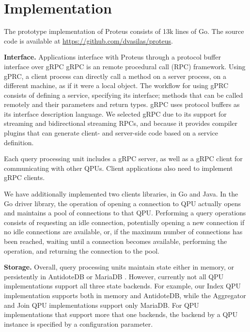\section{Implementation}
\label{sec:implementation}

The prototype implementation of Proteus consists of 13k lines of Go.
The source code is available at \url{https://github.com/dvasilas/proteus}.


\bigskip
\noindent
\textbf{Interface.}
Applications interface with Proteus through a protocol buffer \cite{protobuf:docs} interface over gRPC \cite{grpc:docs}
gRPC is an remote procedural call (RPC) framework.
Using gPRC, a client process can directly call a method on a server process, on a different machine, as if it were a local object.
The workflow for using gPRC consists of defining a service, specifying its interface; methods that can be called remotely
and their parameters and return types.
gRPC uses protocol buffers as its interface description language.
We selected gRPC due to its support for streaming and bidirectional streaming RPCs,
and because it provides compiler plugins that can generate client- and server-side code based on a service definition.

Each query processing unit includes a gRPC server, as well as a gRPC client for communicating with other QPUs.
Client applications also need to implement gRPC clients.

\medskip
\noindent
We have additionally implemented two clients libraries, in Go and Java.
In the Go driver library, the operation of opening a connection to QPU actually opens and maintains a pool of connections
to that QPU.
Performing a query operations consists of requesting an idle connection, potentially opening a new connection if no idle
connections are available, or, if the maximum number of connections has been reached,  waiting until a connection becomes
available, performing the operation, and returning the connection to the pool.

\bigskip
\noindent
\textbf{Storage.}
Overall, query processing units maintain state either in memory, or persistently in AntidoteDB \cite{antidotedb:docs} or
MariaDB \cite{mariadb:docs}.
However, currently not all QPU implementations support all three state backends.
For example, our Index QPU implementation supports both in memory and AntidoteDB,
while the Aggregator and Join QPU implementations support only MariaDB.
For QPU implementations that support more that one backends,
the backend by a QPU instance is specified by a configuration parameter.


